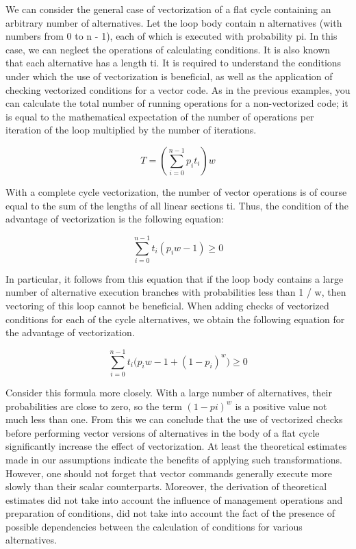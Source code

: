 \documentclass[
11pt,%
tightenlines,%
twoside,%
onecolumn,%
nofloats,%
nobibnotes,%
nofootinbib,%
superscriptaddress,%
noshowpacs,%
centertags]%
{revtex4}
\begin{document}
We can consider the general case of vectorization of a flat cycle containing an arbitrary number of alternatives. Let the loop body contain n alternatives (with numbers from 0 to n - 1), each of which is executed with probability pi. In this case, we can neglect the operations of calculating conditions. It is also known that each alternative has a length ti. It is required to understand the conditions under which the use of vectorization is beneficial, as well as the application of checking vectorized conditions for a vector code. As in the previous examples, you can calculate the total number of running operations for a non-vectorized code; it is equal to the mathematical expectation of the number of operations per iteration of the loop multiplied by the number of iterations.

\begin{equation}
T = \left( \sum_{i = 0}^{n - 1}{p_it_i} \right) w
\end{equation}

With a complete cycle vectorization, the number of vector operations is of course equal to the sum of the lengths of all linear sections ti. Thus, the condition of the advantage of vectorization is the following equation:

\begin{equation}
\sum_{i = 0}^{n - 1}{t_i(p_iw - 1)} \ge 0
\end{equation}

In particular, it follows from this equation that if the loop body contains a large number of alternative execution branches with probabilities less than 1 / w, then vectoring of this loop cannot be beneficial. When adding checks of vectorized conditions for each of the cycle alternatives, we obtain the following equation for the advantage of vectorization.

\begin{equation}
\sum_{i = 0}^{n - 1}{t_i \big( p_iw - 1 + (1 - p_i) ^w \big) } \ge 0
\end{equation}

Consider this formula more closely. With a large number of alternatives, their probabilities are close to zero, so the term $(1 - pi) ^ w$ is a positive value not much less than one. From this we can conclude that the use of vectorized checks before performing vector versions of alternatives in the body of a flat cycle significantly increase the effect of vectorization. At least the theoretical estimates made in our assumptions indicate the benefits of applying such transformations. However, one should not forget that vector commands generally execute more slowly than their scalar counterparts. Moreover, the derivation of theoretical estimates did not take into account the influence of management operations and preparation of conditions, did not take into account the fact of the presence of possible dependencies between the calculation of conditions for various alternatives.
\end{document}
